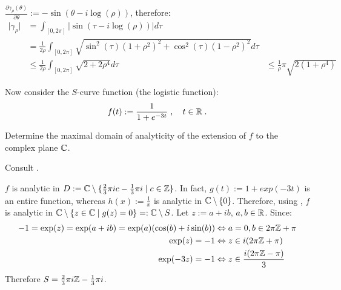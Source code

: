 \begin{problem}
\begin{subproblem}[2]
 \begin{solution}
  $\frac{\partial \gamma_\rho(\theta)}{\partial \theta} := -\sin(\theta - i \log(\rho) )$, therefore:
  \begin{align}
   \lvert \gamma_\rho \rvert & = \int_{[0,2 \pi]} \lvert \sin(\tau - i \log(\rho) ) \rvert d\tau \\
   & = \frac{1}{2 \rho} \int_{[0,2 \pi]} \sqrt{ \sin^2(\tau) (1 + \rho^2)^2 + \cos^2(\tau) (1 - \rho^2)^2 } d\tau \\
   & \leq \frac{1}{2 \rho} \int_{[0,2 \pi]} \sqrt{ 2 + 2\rho^4 } d\tau
   & \leq \frac{1}{\rho} \pi \sqrt{ 2 (1 + \rho^4) }
  \end{align}
 \end{solution}
\end{subproblem}

Now consider the $S$-curve function (the logistic function):
\begin{align*}
 f(t) := \frac{1}{1+e^{-3t}}\;,\quad t \in \mathbb{R}\;.
\end{align*}

\begin{subproblem}[2] \label{subprb:max_dom_analyticity}
 Determine the maximal domain of analyticity of the extension of $f$ to the complex plane $\mathbb{C}$.
 \begin{hint}
  Consult .
 \end{hint}
 
 \begin{solution}
  $f$ is analytic in $D := \mathbb{C} \setminus \{ \frac{2}{3} \pi i c - \frac{1}{3} \pi i \; | \; c \in \mathbb{Z} \}$. In fact, $g(t) := 1 + exp(-3t)$ is an entire function, whereas $h(x) := \frac{1}{x}$ is analytic in $\mathbb{C} \setminus \{ 0 \}$. Therefore, using , $f$ is analytic in $\mathbb{C} \setminus \{ z \in \mathbb{C} \; | \; g(z) = 0 \} =: \mathbb{C} \setminus S$. 
  Let $z := a + ib$, $a,b \in \mathbb{R}$. Since:
  \begin{align}
   -1 = \exp(z) = \exp(a + ib) = \exp(a) (\cos(b) + i \sin(b)) & \Leftrightarrow a = 0, b \in 2 \pi \mathbb{Z} + \pi \\
   \exp(z) = -1 & \Leftrightarrow z \in i(2 \pi  \mathbb{Z} + \pi) \\
   \exp(-3z) = -1 & \Leftrightarrow z \in \frac{i(2 \pi \mathbb{Z} - \pi)}{3}
  \end{align}
  Therefore $S = \frac{2}{3} \pi i \mathbb{Z} - \frac{1}{3} \pi i$.
 \end{solution}
\end{subproblem}


\end{problem}
